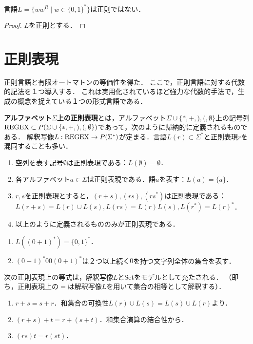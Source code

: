 \documentclass[uplatex, dvipdfmx]{jsreport}
\begin{document}
\begin{corollary}[回文]
    言語$L=\{ww^R\mid w\in\{0,1\}^*\}$は正則ではない．
\end{corollary}
\begin{proof}
    $L$を正則とする．
\end{proof}

\section{正則表現}

\begin{screen}
    正則言語と有限オートマトンの等価性を得た．
    ここで，正則言語に対する代数的記法を１つ導入する．
    これは実用化されているほど強力な代数的手法で，生成の概念を捉えている１つの形式言語である．
\end{screen}

\begin{definition}
    \textbf{アルファベット$\Sigma$上の正則表現}とは，アルファベット$\Sigma\cup\{*,+,),(,\emptyset\}$上の記号列$\mathrm{REGEX}\subset P(\Sigma\cup\{*,+,),(,\emptyset\})$であって，次のように帰納的に定義されるものである．
    解釈写像$L:\mathrm{REGEX}\to P(\Sigma^*)$が定まる．言語$L(r)\subset\Sigma^*$と正則表現$r$を混同することも多い．
    \begin{enumerate}
        \item 空列を表す記号$\emptyset$は正則表現である：$L(\emptyset)=\emptyset$．
        \item 各アルファベット$a\in\Sigma$は正則表現である．語$a$を表す：$L(a)=\{a\}$．
        \item $r,s$を正則表現とすると，$(r+s),(rs),(rs^*)$は正則表現である：$L(r+s)=L(r)\cup L(s), L(rs)=L(r)L(s),L(r^*)=L(r)^*$．
        \item 以上のように定義されるもののみが正則表現である．
    \end{enumerate}
\end{definition}
\begin{example}\mbox{}
    \begin{enumerate}
        \item $L((0+1)^*)=\{0,1\}^*$．
        \item $(0+1)^*00(0+1)^*$は２つ以上続く$0$を持つ文字列全体の集合を表す．
    \end{enumerate}
\end{example}

\begin{lemma}
    次の正則表現上の等式は，解釈写像$L$とSetをモデルとして充たされる．
    （即ち，正則表現上の$=$は解釈写像$L$を用いて集合の相等として解釈する）．
    \begin{enumerate}
        \item $r+s=s+r$．和集合の可換性$L(r)\cup L(s)=L(s)\cup L(r)$より．
        \item $(r+s)+t=r+(s+t)$．和集合演算の結合性から．
        \item $(rs)t=r(st)$．
    \end{enumerate}
\end{lemma}
\end{document}
